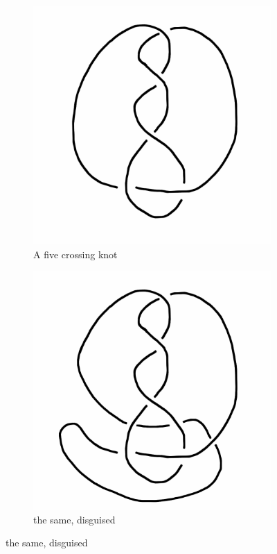 \documentclass[12pt]{amsart}
\theoremstyle{definition}
\begin{document}
\begin{figure}[h]
        \centering
        \begin{subfigure}[b]{0.3\textwidth}
                \includegraphics[width=\textwidth]{knotpics/sixcross.png}
                \caption{A five crossing knot}
        \end{subfigure}
        \begin{subfigure}[b]{0.3\textwidth}
                \includegraphics[width=\textwidth]{knotpics/sixcross-twistes.png}
                \caption{the same, disguised}
        \end{subfigure}
\end{figure}
\end{document}
